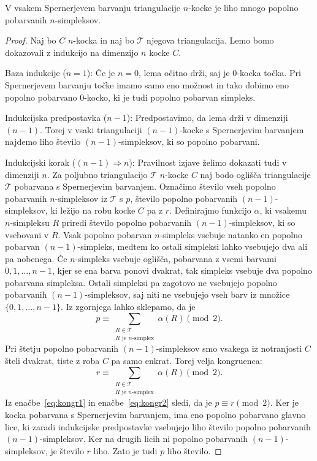 \documentclass[mat1]{fmfdelo}
\newcommand{\0}{0}
\newcommand{\pT}{\mathcal T}
\begin{document}
\begin{lema}\label{izr:kubsperner}
V vsakem Spernerjevem barvanju triangulacije $n$-kocke je liho mnogo popolno pobarvanih $n$-simpleksov.
\end{lema}
\begin{proof}
Naj bo $C$ $n$-kocka in naj bo $\pT$ njegova triangulacija. Lemo bomo dokazovali z indukcijo na dimenzijo $n$ kocke $C$.

Baza indukcije ($n = 1$):
Če je $n = 0$, lema očitno drži, saj je $0$-kocka točka. Pri Spernerjevem barvanju točke imamo samo eno možnost in tako dobimo eno popolno pobarvano $0$-kocko, ki je tudi popolno pobarvan simpleks.

Indukcijska predpostavka ($n - 1$):
Predpostavimo, da lema drži v dimenziji $(n - 1)$. Torej v vsaki triangulaciji $(n - 1)$-kocke s Spernerjevim barvanjem najdemo liho število $(n - 1)$-simpleksov, ki so popolno pobarvani.

Indukcijski korak ($(n - 1) \Longrightarrow n$):
Pravilnost izjave želimo dokazati tudi v dimenziji $n$. Za poljubno triangulacijo $\pT$ $n$-kocke $C$ naj bodo oglišča triangulacije $\pT$ pobarvana s Spernerjevim barvanjem. Označimo število vseh popolno pobarvanih $n$-simpleksov iz $\pT$ s $p$, število popolno pobarvanih $(n-1)$-simpleksov, ki ležijo na robu kocke $C$ pa z $r$. Definirajmo funkcijo $\alpha$, ki vsakemu $n$-simpleksu $R$ priredi število popolno pobarvanih $(n-1)$-simpleksov, ki so vsebovani v $R$. Vsak popolno pobarvan $n$-simpleks vsebuje natanko en popolno pobarvan $(n-1)$-simpleks, medtem ko ostali simpleksi lahko vsebujejo dva ali pa nobenega. Če $n$-simpleks vsebuje oglišča, pobarvana z vsemi barvami $0, 1, \dots, n-1$, kjer se ena barva ponovi dvakrat, tak simpleks vsebuje dva popolno pobarvana simpleksa. Ostali simpleksi pa zagotovo ne vsebujejo popolno pobarvanih $(n - 1)$-simpleksov, saj niti ne vsebujejo vseh barv iz množice $\{0, 1, \dots, n-1 \}$. Iz zgornjega lahko sklepamo, da je
\begin{equation}\label{eq:kongr11}
p \equiv 
\sum\limits_{\substack{
R \in \pT
 \\ 
R\text{ je } n\text{-simplex}
 }}
  \alpha(R) \pmod 2.
\end{equation}
Pri štetju popolno pobarvanih $(n - 1)$-simpleksov smo vsakega iz notranjosti $C$ šteli dvakrat, tiste z roba $C$ pa samo enkrat. Torej velja kongruenca:
\begin{equation}\label{eq:kongr12}
r \equiv 
\sum\limits_{\substack{
R \in \pT
 \\ 
R\text{ je } n\text{-simplex}
 }}
  \alpha(R) \pmod 2.
\end{equation}
Iz enačbe~\eqref{eq:kongr1} in enačbe~\eqref{eq:kongr2} sledi, da je $p \equiv r \pmod 2$.
Ker je kocka pobarvana s Spernerjevim barvanjem, ima eno popolno pobarvano glavno lice, ki zaradi indukcijske predpostavke vsebujejo liho število popolno pobarvanih $(n - 1)$-simpleksov. Ker na drugih licih ni popolno pobarvanih $(n - 1)$-simpleksov, je število $r$ liho. Zato je tudi $p$ liho število.
\end{proof}
\newpage
\end{document}
